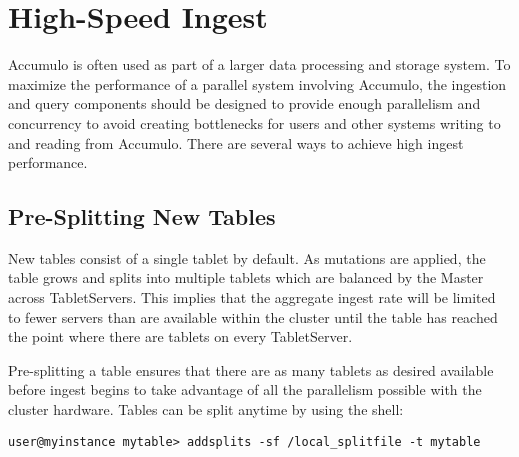 
%
%

\chapter{High-Speed Ingest}

Accumulo is often used as part of a larger data processing and storage system. To
maximize the performance of a parallel system involving Accumulo, the ingestion
and query components should be designed to provide enough parallelism and
concurrency to avoid creating bottlenecks for users and other systems writing to
and reading from Accumulo. There are several ways to achieve high ingest
performance.

\section{Pre-Splitting New Tables}

New tables consist of a single tablet by default. As mutations are applied, the table
grows and splits into multiple tablets which are balanced by the Master across
TabletServers. This implies that the aggregate ingest rate will be limited to fewer
servers than are available within the cluster until the table has reached the point
where there are tablets on every TabletServer.

Pre-splitting a table ensures that there are as many tablets as desired available
before ingest begins to take advantage of all the parallelism possible with the cluster
hardware. Tables can be split anytime by using the shell:

\begingroup\fontsize{8pt}{8pt}\selectfont\begin{verbatim}
user@myinstance mytable> addsplits -sf /local_splitfile -t mytable
\end{verbatim}\endgroup

